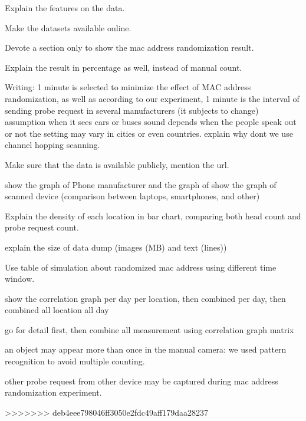 Explain the features on the data.

Make the datasets available online.

Devote a section only to show the mac address randomization result.

Explain the result in percentage as well, instead of manual count.

Writing:
1 minute is selected to minimize the effect of MAC address randomization, as well as according to our experiment, 1 minute is the interval of sending probe request in several manufacturers (it subjects to change)
assumption when it sees cars or buses
sound depends when the people speak out or not
the setting may vary in cities or even countries.
explain why dont we use channel hopping scanning.

Make sure that the data is available publicly, mention the url.


show the graph of Phone manufacturer and the graph of show the graph of scanned device (comparison between laptops, smartphones, and other)

Explain the density of each location in bar chart, comparing both head count and probe request count.

explain the size of data dump (images (MB) and text (lines))

Use table of simulation about randomized mac address using different time window.

show the correlation graph per day per location, then combined per day, then combined all location all day

go for detail first, then combine all measurement using correlation graph matrix

an object may appear more than once in the manual camera: we used pattern recognition to avoid multiple counting.

other probe request from other device may be captured during mac address randomization experiment.

>>>>>>> deb4eee798046ff3050e2fdc49aff179daa28237
